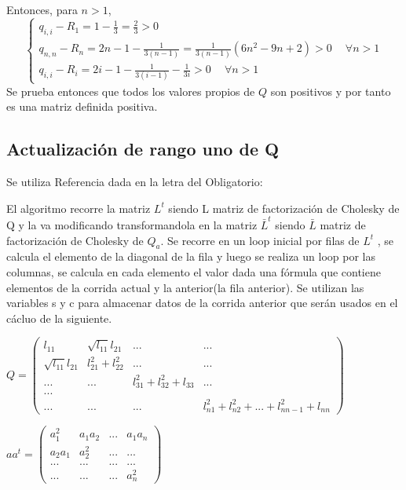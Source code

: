 \documentclass{endm}
\begin{document}
Entonces, para $n > 1$,
\begin{equation}
    \begin{cases}
        q_{i,i} - R_1 = 1 - \frac{1}{3} = \frac{2}{3} > 0 \\
        q_{n,n} - R_n =  2n-1 - \frac{1}{3(n-1)} = \frac{1}{3(n-1)}(6n^2 - 9n + 2) > 0 \phantom{-}\forall n>1 \\
        q_{i,i} - R_i = 2i-1 - \frac{1}{3(i-1)} - \frac{1}{3i} > 0 \phantom{-}\forall n>1
    \end{cases}
\end{equation}
Se prueba entonces que todos los valores propios de $Q$ son positivos y por tanto es una matriz definida positiva.

\subsection{Actualización de rango uno de Q}
Se utiliza Referencia dada en la letra del Obligatorio: \cite{rankcholesky}


El algoritmo recorre la matriz $L^{t}$  siendo L matriz de factorización de Cholesky de Q
y  la va modificando transformandola en la matriz $\bar{L}^{t}$ siendo $\bar{L}$ matriz de factorización de Cholesky de $Q_{a}$.
Se recorre en un loop inicial por filas de $L^{t}$ , se calcula el elemento de la diagonal de la fila y luego se realiza un loop por las columnas, se calcula en cada elemento el valor dada una fórmula que contiene elementos de la corrida actual y la anterior(la fila anterior).
Se utilizan las variables s y c para almacenar datos de la corrida anterior que serán usados en el cácluo de la siguiente.


$Q=\begin{pmatrix}
l_{11}                &\sqrt{l_{11}}l_{21}   &...                                &... \\ 
\sqrt{l_{11}}l_{21}   &l_{21}^{2}+l_{22}^{2} &...                                &... \\ 
...                   &...                   &l_{31}^{2}+l_{32}^{2}+l_{33}       &... \\
... \\ 
 ...                   &...                   &...                               &l_{n1}^{2}+l_{n2}^{2}+...+l_{nn-1}^{2}+l_{nn} 
\end{pmatrix}$


$aa^{t}=\begin{pmatrix}
a_{1}^{2}         &a_{1}a_{2}     &...  &a_{1}a_{n} \\ 
a_{2}a_{1}        &a_{2}^{2}      &...       &... \\ 
 ...                  &...       &...       &... \\

 ...                   &...       &...       &a_{n}^{2} 
\end{pmatrix}$
\end{document}
